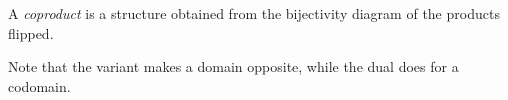 \begin{definition}[Coproduct]
A \emph{coproduct} is a structure obtained from the bijectivity diagram of the products flipped.
\end{definition}
\begin{remark}
Note that the variant makes a domain opposite, while the dual does for a codomain.
\end{remark}

